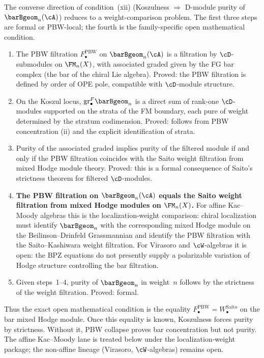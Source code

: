 \begin{remark}
\label{rem:d-module-purity-content}
The converse direction of condition~\textup{(xii)} (Koszulness
$\Longrightarrow$ D-module purity of~$\barBgeom_n(\cA)$) reduces to a
weight-comparison problem. The first three steps are formal or
PBW-local; the fourth is the family-specific open mathematical condition.

\begin{enumerate}[label=\textup{Step \arabic*.}]
\item
The PBW filtration $F_\bullet^{\mathrm{PBW}}$ on
$\barBgeom_n(\cA)$ is a filtration by $\cD$-submodules on
$\FM_n(X)$, with associated graded given by the FG bar complex
(the bar of the chiral Lie algebra).
\textup{Proved:} the PBW filtration is defined by order of OPE
pole, compatible with $\cD$-module structure.

\item
On the Koszul locus, $\mathrm{gr}^F_\bullet \barBgeom_n$ is
a direct sum of rank-one $\cD$-modules supported on the
strata of the FM boundary, each pure of weight determined
by the stratum codimension.
\textup{Proved:} follows from PBW concentration
\textup{(ii)} and the explicit identification of strata.

\item
Purity of the associated graded implies purity of the
filtered module if and only if the PBW filtration
coincides with the Saito weight filtration from mixed
Hodge module theory.
\textup{Proved:} this is a formal consequence of Saito's
strictness theorem for filtered $\cD$-modules.

\item
\textbf{The PBW filtration on $\barBgeom_n(\cA)$ equals
the Saito weight filtration from mixed Hodge modules on
$\FM_n(X)$.}
For affine Kac--Moody algebras this is the localization-weight
comparison: chiral localization must identify $\barBgeom_n$ with the
corresponding mixed Hodge module on the Beilinson--Drinfeld
Grassmannian and identify the PBW filtration with the
Saito--Kashiwara weight filtration. For Virasoro and $\cW$-algebras it
is open: the BPZ equations do not presently supply a polarizable
variation of Hodge structure controlling the bar filtration.

\item
Given steps~1--4, purity of $\barBgeom_n$ in weight~$n$
follows by the strictness of the weight filtration.
\textup{Proved:} formal.
\end{enumerate}

\noindent
Thus the exact open mathematical condition is the equality
$F_\bullet^{\mathrm{PBW}}=W_\bullet^{\mathrm{Saito}}$ on the bar
mixed Hodge module. Once this equality is known, Koszulness forces
purity by strictness. Without it, PBW collapse proves bar
concentration but not purity. The affine Kac--Moody lane is treated
below under the localization-weight package; the non-affine lineage
(Virasoro, $\cW$-algebras) remains open.
\end{remark}

